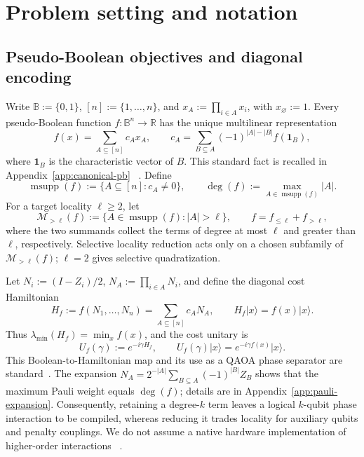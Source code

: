 \documentclass[a4paper,onecolumn,11pt,unpublished]{quantumarticle}
\theoremstyle{remark}
\begin{document}
\section{Problem setting and notation}
\label{sec:preliminaries}

\subsection{Pseudo-Boolean objectives and diagonal encoding}
\label{sec:pb-diagonal}

Write \(\mathbb{B}:=\{0,1\}\), \([n]:=\{1,\ldots,n\}\), and
\(x_A:=\prod_{i\in A}x_i\), with \(x_\varnothing:=1\).  Every
pseudo-Boolean function \(f:\mathbb{B}^n\to\mathbb{R}\) has the unique
multilinear representation
\begin{equation}
  f(x)=\sum_{A\subseteq[n]}c_Ax_A,
  \qquad
  c_A=\sum_{B\subseteq A}(-1)^{|A|-|B|}f(\mathbf{1}_B),
  \label{eq:canonical-pb}
\end{equation}
where \(\mathbf{1}_B\) is the characteristic vector of \(B\).  This standard
fact is recalled in Appendix~\ref{app:canonical-pb}
~\cite{BorosHammer2002,Hadfield2021}.  Define
\begin{equation}
  \operatorname{msupp}(f):=\{A\subseteq[n]:c_A\neq0\},
  \qquad
  \deg(f):=\max_{A\in\operatorname{msupp}(f)}|A|.
  \label{eq:support-degree}
\end{equation}
For a target locality \(\ell\geq2\), let
\begin{equation}
  \mathcal{M}_{>\ell}(f):=
  \{A\in\operatorname{msupp}(f):|A|>\ell\},
  \qquad
  f=f_{\leq\ell}+f_{>\ell},
  \label{eq:target-split}
\end{equation}
where the two summands collect the terms of degree at most \(\ell\) and greater
than \(\ell\), respectively.  Selective locality reduction acts only on a
chosen subfamily of \(\mathcal{M}_{>\ell}(f)\); \(\ell=2\) gives selective
quadratization.

Let \(N_i:=(I-Z_i)/2\), \(N_A:=\prod_{i\in A}N_i\), and define the diagonal
cost Hamiltonian
\begin{equation}
  H_f:=f(N_1,\ldots,N_n)=\sum_{A\subseteq[n]}c_AN_A,
  \qquad
  H_f\lvert x\rangle=f(x)\lvert x\rangle.
  \label{eq:diagonal-cost}
\end{equation}
Thus \(\lambda_{\min}(H_f)=\min_x f(x)\), and the cost unitary is
\begin{equation}
  U_f(\gamma):=e^{-i\gamma H_f},
  \qquad
  U_f(\gamma)\lvert x\rangle=e^{-i\gamma f(x)}\lvert x\rangle.
  \label{eq:phase-separator}
\end{equation}
This Boolean-to-Hamiltonian map and its use as a QAOA phase separator are
standard~\cite{Hadfield2021,Farhi2014}.
The expansion \(N_A=2^{-|A|}\sum_{B\subseteq A}(-1)^{|B|}Z_B\) shows that
the maximum Pauli weight equals \(\deg(f)\); details are in
Appendix~\ref{app:pauli-expansion}.  Consequently, retaining a degree-\(k\)
term leaves a logical \(k\)-qubit phase interaction to be compiled, whereas
reducing it trades locality for auxiliary qubits and penalty couplings.  We do
not assume a native hardware implementation of higher-order interactions
~\cite{CampbellDahl2022,Schmidbauer2024}.
\end{document}
